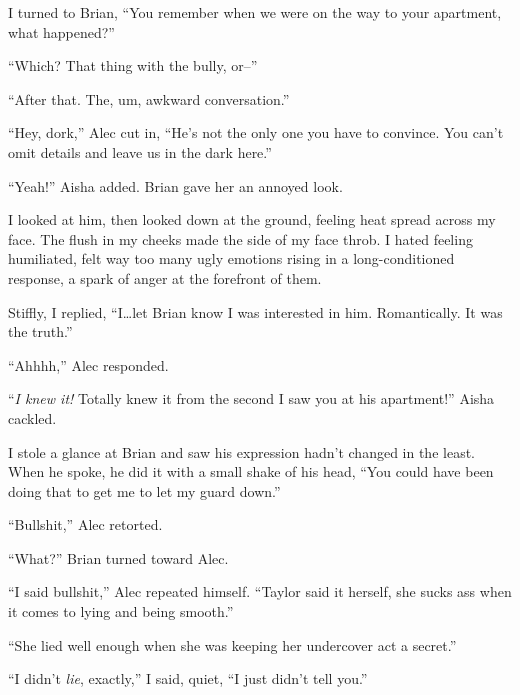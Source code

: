 I turned to Brian, ``You remember when we were on the way to your apartment, what happened?''



``Which?  That thing with the bully, or--''



``After that.  The, um, awkward conversation.''



``Hey, dork,'' Alec cut in, ``He's not the only one you have to convince.  You can't omit details and leave us in the dark here.''



``Yeah!'' Aisha added.  Brian gave her an annoyed look.



I looked at him, then looked down at the ground, feeling heat spread across my face.  The flush in my cheeks made the side of my face throb.  I hated feeling humiliated, felt way too many ugly emotions rising in a long-conditioned response, a spark of anger at the forefront of them.



Stiffly, I replied, ``I\ldots let Brian know I was interested in him.  Romantically.  It was the truth.''



``Ahhhh,'' Alec responded.



``\emph{I knew it!}  Totally knew it from the second I saw you at his apartment!''  Aisha cackled.



I stole a glance at Brian and saw his expression hadn't changed in the least.  When he spoke, he did it with a small shake of his head, ``You could have been doing that to get me to let my guard down.''



``Bullshit,'' Alec retorted.



``What?'' Brian turned toward Alec.



``I said bullshit,'' Alec repeated himself.  ``Taylor said it herself, she sucks ass when it comes to lying and being smooth.''



``She lied well enough when she was keeping her undercover act a secret.''



``I didn't \emph{lie}, exactly,'' I said, quiet, ``I just didn't tell you.''



